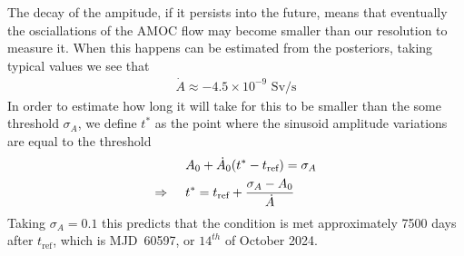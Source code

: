 \documentclass{article}
\newcommand{\tref}{t_{\textrm{ref}}}
\begin{document}
The decay of the ampitude, if it persists into the future, means that eventually
the osciallations of the AMOC flow may become smaller than our resolution to
measure it. When this happens can be estimated from the posteriors, taking
typical values we see that
\begin{align}
\dot{A} \approx -4.5\times10^{-9}\textrm{ Sv/s}
\end{align}
In order to estimate how long it will take for this to be smaller than the
some threshold $\sigma_A$, we define $t^{*}$ as the point where the sinusoid amplitude
variations are equal to the threshold
\begin{align}
 & A_0 + \dot{A}_0(t^{*} - \tref) = \sigma_A  \\
\Rightarrow \hspace{5mm}  & t^{*}   = \tref + \frac{\sigma_A - A_0}{\dot{A}}
\end{align}
Taking $\sigma_A = 0.1$ this predicts that the condition is met approximately
7500 days after $\tref$, which is MJD~60597, or $14^{th}$ of October 2024.
\end{document}
